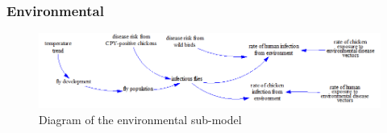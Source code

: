 \subsubsection*{Environmental}

\begin{figure}[!ht]
	\centering
	\includegraphics[width=1\textwidth]{images/environmental_submodel2.png}
	\caption{Diagram of the environmental sub-model}
	\label{fig:environmental_submodel}
\end{figure}



